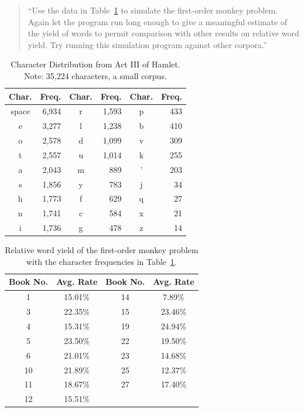 \documentclass[conference]{IEEEtran}
\newcommand{\codefile}[1]{
  \begin{framed}
  \fontsize{5.65}{6.78}\selectfont
  
  \end{framed}
}
\begin{document}
\begin{quote}
``Use the data in Table~\ref{tab:hamlet} to simulate the first-order monkey problem. 
Again let the program run long enough to give a meaningful estimate of the yield 
of words to permit comparison with other results on relative word yield. Try running
this simulation program against other corpora.''
\end{quote}

\begin{table}
\caption{\hspace{2em}Character Distribution from Act III of Hamlet. \newline
Note: 35,224 characters, a small corpus.\label{tab:hamlet}}
\vspace{-10pt}
\begin{center}
\begin{tabular}{crcrcr}
\hline
Char. & Freq. & Char. & Freq. & Char. & Freq. \\
\hline
space & 6,934  & r     & 1,593  & p     & 433   \\
e     & 3,277  & l     & 1,238  & b     & 410   \\
o     & 2,578  & d     & 1,099  & v     & 309   \\
t     & 2,557  & u     & 1,014  & k     & 255   \\
a     & 2,043  & m     & 889   & '     & 203   \\
s     & 1,856  & y     & 783   & j     & 34    \\
h     & 1,773  & f     & 629   & q     & 27    \\
n     & 1,741  & c     & 584   & x     & 21    \\
i     & 1,736  & g     & 478   & z     & 14    \\
\hline
\end{tabular}
\end{center}
\end{table}

\codefile{problem1b.py}

\begin{table}
\caption{Relative word yield of the first-order monkey problem \newline
with the character frequencies in Table~\ref{tab:hamlet}.\label{tab:problem1b}}
\vspace{-10pt}
\begin{center}
\begin{tabular}{cccc}
\hline
Book No. & Avg. Rate & Book No. & Avg. Rate \\
\hline
1  & 15.01\% & 14 & 7.89\% \\
3  & 22.35\% & 15 & 23.46\% \\
4  & 15.31\% & 19 & 24.94\% \\
5  & 23.50\% & 22 & 19.50\% \\
6  & 21.01\% & 23 & 14.68\% \\
10 & 21.89\% & 25 & 12.37\% \\
11 & 18.67\% & 27 & 17.40\% \\
12 & 15.51\% & & \\
\hline
\end{tabular}
\end{center}
\end{table}
\end{document}
